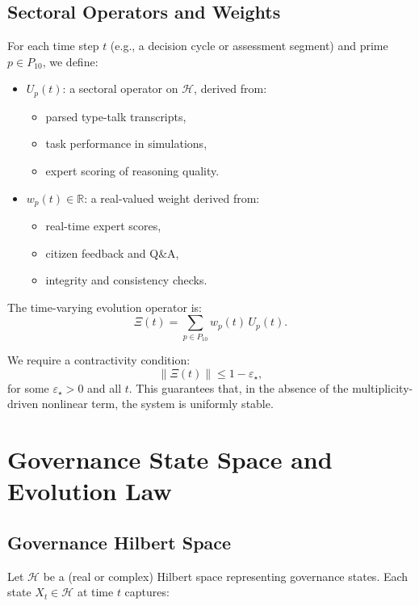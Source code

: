 \documentclass[11pt]{article}
\begin{document}
\subsection{Sectoral Operators and Weights}

For each time step \(t\) (e.g., a decision cycle or assessment segment) and prime \(p \in P_{10}\), we define:

\begin{itemize}[leftmargin=1.5em]
    \item \(U_p(t)\): a sectoral operator on \(\mathcal{H}\), derived from:
    \begin{itemize}
        \item parsed type-talk transcripts,
        \item task performance in simulations,
        \item expert scoring of reasoning quality.
    \end{itemize}
    \item \(w_p(t) \in \mathbb{R}\): a real-valued weight derived from:
    \begin{itemize}
        \item real-time expert scores,
        \item citizen feedback and Q\&A,
        \item integrity and consistency checks.
    \end{itemize}
\end{itemize}

The time-varying evolution operator is:
\[
  \Xi(t) = \sum_{p \in P_{10}} w_p(t) \, U_p(t).
\]

We require a contractivity condition:
\[
  \|\Xi(t)\| \leq 1 - \varepsilon_\star,
\]
for some \(\varepsilon_\star > 0\) and all \(t\). This guarantees that, in the absence of the multiplicity-driven nonlinear term, the system is uniformly stable.

\section{Governance State Space and Evolution Law}

\subsection{Governance Hilbert Space}

Let \(\mathcal{H}\) be a (real or complex) Hilbert space representing governance states. Each state \(X_t \in \mathcal{H}\) at time \(t\) captures:
\end{document}
